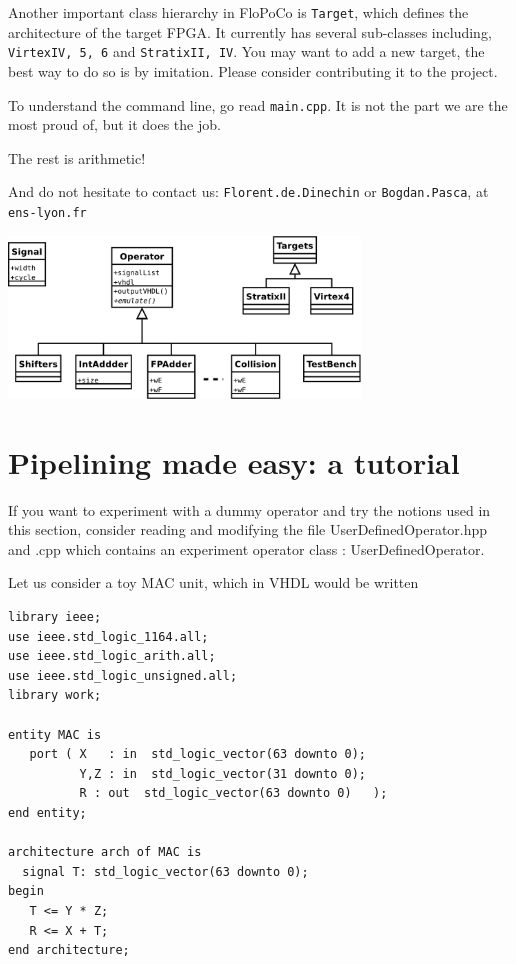\documentclass{article}
\begin{document}
Another important class hierarchy in FloPoCo is \texttt{Target}, which
defines the architecture of the target FPGA. It currently has several sub-classes 
including, \texttt{VirtexIV, 5, 6} and \texttt{StratixII, IV}. You may want to
add a new target, the best way to do so is by imitation. Please
consider contributing it to the project.

To understand the command line, go read \texttt{main.cpp}. It is not
the part we are the most proud of, but it does the job.

The rest is arithmetic!

And do not hesitate to contact us: \texttt{Florent.de.Dinechin} or
\texttt{Bogdan.Pasca}, at \texttt{ens-lyon.fr}

\begin{center}
  \begin{latexonly}
  \includegraphics[width=0.7\textwidth]{../Figures/FloPoCoClasses.pdf}        
  \end{latexonly}
\end{center}


\section{Pipelining made easy: a tutorial}
\label{sec:pme}


If you want to experiment with a dummy operator and try the notions used in this
section, consider reading and modifying the file UserDefinedOperator.hpp and
.cpp which contains an experiment operator class : UserDefinedOperator.


Let us consider a toy MAC unit, which in VHDL would be written
\begin{verbatim}
library ieee;
use ieee.std_logic_1164.all;
use ieee.std_logic_arith.all;
use ieee.std_logic_unsigned.all;
library work;

entity MAC is
   port ( X   : in  std_logic_vector(63 downto 0);
          Y,Z : in  std_logic_vector(31 downto 0);
          R : out  std_logic_vector(63 downto 0)   );
end entity;

architecture arch of MAC is
  signal T: std_logic_vector(63 downto 0);
begin
   T <= Y * Z;
   R <= X + T;
end architecture;
\end{verbatim}
\end{document}
